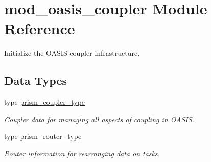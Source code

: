 \hypertarget{namespacemod__oasis__coupler}{}\section{mod\+\_\+oasis\+\_\+coupler Module Reference}
\label{namespacemod__oasis__coupler}


Initialize the O\+A\+S\+IS coupler infrastructure.  


\subsection*{Data Types}
\begin{DoxyCompactItemize}
\item 
type \hyperlink{structmod__oasis__coupler_1_1prism__coupler__type}{prism\+\_\+coupler\+\_\+type}
\begin{DoxyCompactList}\small\item\em Coupler data for managing all aspects of coupling in O\+A\+S\+IS. \end{DoxyCompactList}\item 
type \hyperlink{structmod__oasis__coupler_1_1prism__router__type}{prism\+\_\+router\+\_\+type}
\begin{DoxyCompactList}\small\item\em Router information for rearranging data on tasks. \end{DoxyCompactList}\end{DoxyCompactItemize}
